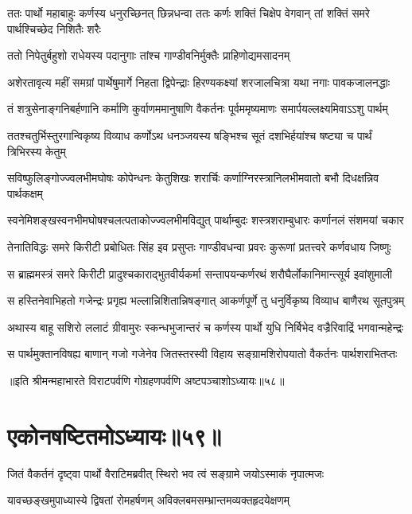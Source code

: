 \threelineshloka
{ततः पार्थो महाबाहुः कर्णस्य धनुरच्छिनत्}
{छिन्नधन्वा ततः कर्णः शक्तिं चिक्षेप वेगवान्}
{तां शक्तिं समरे पार्थश्चिच्छेद निशितैः शरैः}


\twolineshloka
{ततो निपेतुर्बहुशो राधेयस्य पदानुगाः}
{तांश्च गाण्डीवनिर्मुक्तैः प्राहिणोद्यमसादनम्}


\twolineshloka
{अशेरतावृत्य महीं समग्रां पार्थेषुमार्गे निहता द्विपेन्द्राः}
{हिरण्यकक्ष्यां शरजालचित्रा यथा नगाः पावकजालनद्धाः}


\twolineshloka
{तं शत्रुसेनाङ्गनिबर्हणानि कर्माणि कुर्वाणममानुषाणि}
{वैकर्तनः पूर्वममृष्यमाणः समार्पयल्लक्ष्यमिवाऽऽशु पार्थम्}


\twolineshloka
{ततश्चतुर्भिस्तुरगान्विकृष्य विव्याध कर्णोऽथ धनञ्जयस्य}
{षङ्भिश्च सूतं दशभिर्हयांश्च षष्ट्या च पार्थं त्रिभिरस्य केतुम्}


\twolineshloka
{सविष्फुलिङ्गोज्ज्वलभीमघोषः कोपेन्धनः केतुशिखः शरार्चिः}
{कर्णाग्निरस्त्रानिलभीमवातो बभौ दिधक्षन्निव पार्थकक्षम्}


\twolineshloka
{स्वनेमिशङ्खस्वनभीमघोषश्चलत्पताकोज्ज्वलभीमविद्युत्}
{पार्थाम्बुदः शस्त्रशराम्बुधारः कर्णानलं संशमयां चकार}


\twolineshloka
{तेनातिविद्धः समरे किरीटी प्रबोधितः सिंह इव प्रसुप्तः}
{गाण्डीवधन्वा प्रवरः कुरूणां प्रतत्त्वरे कर्णवधाय जिष्णुः}


\twolineshloka
{स ब्राह्ममस्त्रं समरे किरीटी प्रादुश्चकाराद्भुतवीर्यकर्मा}
{सन्तापयन्कर्णरथं शरौघैर्लोकानिमान्त्सूर्य इवांशुमाली}


\twolineshloka
{स हस्तिनेवाभिहतो गजेन्द्रः प्रगृह्य भल्लान्निशितान्निषङ्गात्}
{आकर्णपूर्णे तु धनुर्विकृष्य विव्याध बाणैरथ सूतपुत्रम्}


\twolineshloka
{अथास्य बाहू सशिरो ललाटं ग्रीवामुरः स्कन्धभुजान्तरं च}
{कर्णस्य पार्थो युधि निर्बिभेद वज्रैरिवाद्रिं भगवान्महेन्द्रः}


\twolineshloka
{स पार्थमुक्तानविषह्य बाणान् गजो गजेनेव जितस्तरस्वी}
{विहाय सङ्ग्रामशिरोपयातो वैकर्तनः पार्थशराभितप्तः}

॥इति श्रीमन्महाभारते विराटपर्वणि गोग्रहणपर्वणि अष्टपञ्चाशोऽध्यायः॥५८॥

\chapter{एकोनषष्टितमोऽध्यायः॥५९॥}

\twolineshloka
{जितं वैकर्तनं दृष्ट्वा पार्थो वैराटिमब्रवीत्}
{स्थिरो भव त्वं सङ्ग्रामे जयोऽस्माकं नृपात्मजः}


\twolineshloka
{यावच्छङ्खमुपाध्यास्ये द्विषतां रोमहर्षणम्}
{अविक्लबमसम्भ्रान्तमव्यक्तहृदयेक्षणम्}



